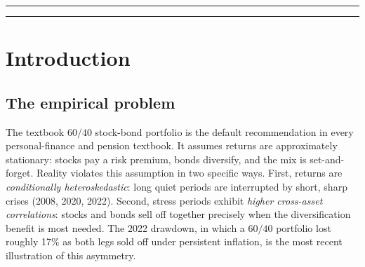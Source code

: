 \documentclass[11pt]{article}
\theoremstyle{plain1}
\theoremstyle{definition1}
\newcommand{\1}{\mathbf{1}}
\begin{document}
\begin{abstract}
The substantive findings are three-fold. First, with the belief filter applied in the same standardised observation space the HMM is calibrated in, the underlying MDP at the canonical CRRA $\gamma{=}2$ is genuinely regime-differentiated (100\% equity in the bull regime, 100\% bonds in the bear regime), and the resulting QMDP overlay attains a Sharpe ratio of 1.18 in a twelve-strategy horse race, beating the static 60/40 (0.81) and essentially tying the HMM-conditional mean-variance baseline (1.20), while cutting maximum drawdown from $-34\%$ to $-14\%$. Second, this regime differentiation is robust: it holds at every CRRA level we test, across five observation cohorts (the +Stress cohort with NFCI and STLFSI4 attains the lowest BIC), and across three economically distinct sub-periods (QMDP Sharpe 1.16/1.30/1.17, beating the static benchmark in each). Third, expanding-window walk-forward refit further improves the overlay, more than halving maximum drawdown. The empirical leader of the horse race remains the Faber 10-month-SMA trend rule (Sharpe 1.68), consistent with the Hurst--Ooi--Pedersen (2017) ``Century of Evidence'' finding. We close with three methodological extensions (point-based VI; off-policy evaluation via importance sampling; CVaR-penalised reward) and an honest verdict: a correctly-specified POMDP regime overlay is a competitive risk-adjusted allocator that beats the static benchmark and ties model-based mean-variance, but does not overtake the practitioner-consensus trend rule on this sample.
\end{abstract}

\bigskip\hrule\medskip
\tableofcontents
\bigskip\hrule

\section{Introduction}\label{sec:intro}

\subsection{The empirical problem}

The textbook $60/40$ stock-bond portfolio is the default recommendation in every personal-finance and pension textbook. It assumes returns are approximately stationary: stocks pay a risk premium, bonds diversify, and the mix is set-and-forget. Reality violates this assumption in two specific ways. First, returns are \emph{conditionally heteroskedastic}: long quiet periods are interrupted by short, sharp crises (2008, 2020, 2022). Second, stress periods exhibit \emph{higher cross-asset correlations}: stocks and bonds sell off together precisely when the diversification benefit is most needed. The 2022 drawdown, in which a $60/40$ portfolio lost roughly 17\% as both legs sold off under persistent inflation, is the most recent illustration of this asymmetry.
\end{document}
